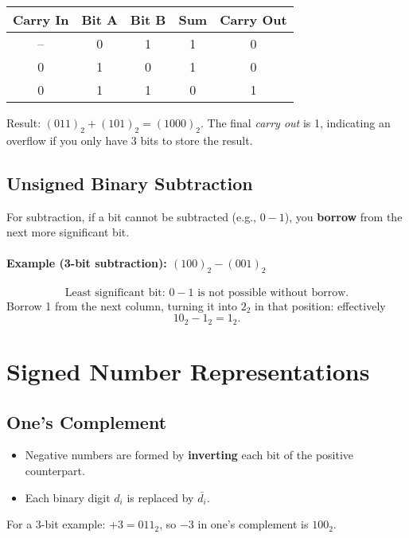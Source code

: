 \documentclass[12pt]{article}
\begin{document}
\begin{center}
\begin{tabular}{c c c c c}
\toprule
Carry In & Bit A & Bit B & Sum & Carry Out \\
\midrule
-- & 0 & 1 & 1 & 0 \\
0  & 1 & 0 & 1 & 0 \\
0  & 1 & 1 & 0 & 1 \\
\bottomrule
\end{tabular}
\end{center}

Result: \((011)_2 + (101)_2 = (1000)_2\). The final \textit{carry out} is 1, indicating an overflow if you only have 3 bits to store the result.

\subsection{Unsigned Binary Subtraction}

For subtraction, if a bit cannot be subtracted (e.g., \(0 - 1\)), you \textbf{borrow} from the next more significant bit.

\paragraph{Example (3-bit subtraction): \((100)_2 - (001)_2\)}
\[
  \text{Least significant bit: } 0 - 1 \text{ is not possible without borrow.}
\]
Borrow 1 from the next column, turning it into \(2_2\) in that position: effectively
\[
  10_2 - 1_2 = 1_2.
\]

\section{Signed Number Representations}

\subsection{One's Complement}

\begin{itemize}
  \item Negative numbers are formed by \textbf{inverting} each bit of the positive counterpart.
  \item Each binary digit \(d_i\) is replaced by \(\bar{d_i}\).
\end{itemize}

For a 3-bit example: \(+3 = 011_{2}\), so \(-3\) in one's complement is \(100_{2}\).
\end{document}
